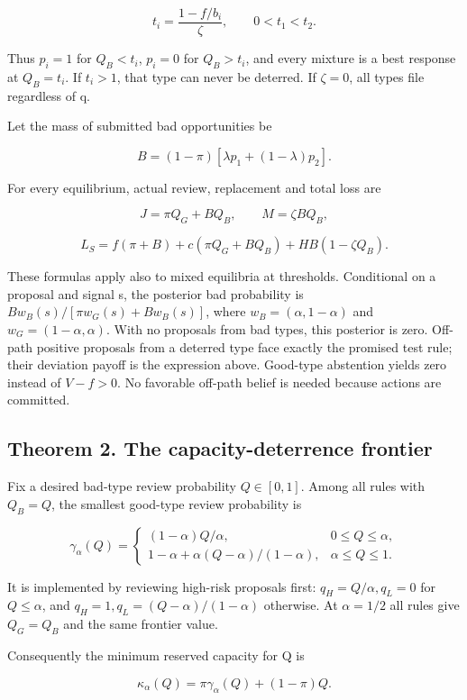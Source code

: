 \documentclass[
  11pt,
]{article}
\begin{document}
\[t_i=\frac{1-f/b_i}{\zeta},\qquad 0<t_1<t_2.\]

Thus \(p_i=1\) for \(Q_B<t_i\), \(p_i=0\) for \(Q_B>t_i\), and every
mixture is a best response at \(Q_B=t_i\). If \(t_i>1\), that type can
never be deterred. If \(\zeta=0\), all types file regardless of q.

Let the mass of submitted bad opportunities be

\[B=(1-\pi)[\lambda p_1+(1-\lambda)p_2].\]

For every equilibrium, actual review, replacement and total loss are

\[J=\pi Q_G+BQ_B,\qquad M=\zeta BQ_B,\]

\[L_S=f(\pi+B)+c(\pi Q_G+BQ_B)+HB(1-\zeta Q_B). \tag{2}\]

These formulas apply also to mixed equilibria at thresholds. Conditional
on a proposal and signal s, the posterior bad probability is
\(B w_B(s)/[\pi w_G(s)+B w_B(s)]\), where \(w_B=(\alpha,1-\alpha)\) and
\(w_G=(1-\alpha,\alpha)\). With no proposals from bad types, this
posterior is zero. Off-path positive proposals from a deterred type face
exactly the promised test rule; their deviation payoff is the expression
above. Good-type abstention yields zero instead of \(V-f>0\). No
favorable off-path belief is needed because actions are committed.

\subsection{Theorem 2. The capacity-deterrence
frontier}\label{theorem-2.-the-capacity-deterrence-frontier}

Fix a desired bad-type review probability \(Q\in[0,1]\). Among all rules
with \(Q_B=Q\), the smallest good-type review probability is

\[\gamma_\alpha(Q)=
\begin{cases}
(1-\alpha)Q/\alpha,&0\leq Q\leq\alpha,\\
1-\alpha+\alpha(Q-\alpha)/(1-\alpha),&\alpha\leq Q\leq1.
\end{cases} \tag{3}\]

It is implemented by reviewing high-risk proposals first:
\(q_H=Q/\alpha,q_L=0\) for \(Q\leq\alpha\), and
\(q_H=1,q_L=(Q-\alpha)/(1-\alpha)\) otherwise. At \(\alpha=1/2\) all
rules give \(Q_G=Q_B\) and the same frontier value.

Consequently the minimum reserved capacity for Q is

\[\kappa_\alpha(Q)=\pi\gamma_\alpha(Q)+(1-\pi)Q. \tag{4}\]
\end{document}

